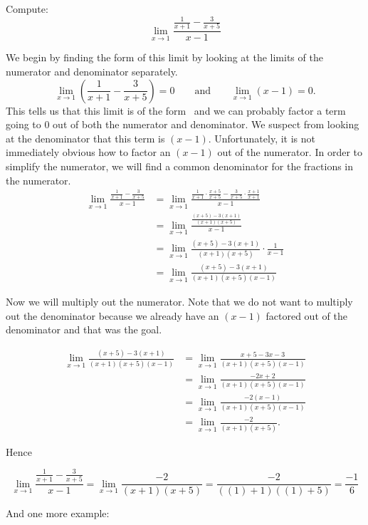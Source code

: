 \documentclass{ximera}
\begin{document}
\begin{example}
  Compute:
  \[
  \lim_{x\to 1} \frac{\frac{1}{x+1}-\frac{3}{x+5}}{x-1}
  \]
\begin{explanation}
  We begin by finding the form of this limit by looking at the limits
  of the numerator and denominator separately.
  \[
  \lim_{x\to 1}\left(\frac{1}{x+1}-\frac{3}{x+5}\right)=0\qquad\text{and}\qquad\lim_{x\to 1}\left(x-1\right)=0.
  \]
This tells us that this limit is of the form \zeroOverZero\ and we can
probably factor a term going to $0$ out of both the numerator and
denominator.  We suspect from looking at the denominator that this
term is $(x-1)$.  Unfortunately, it is not immediately obvious how to
factor an $(x-1)$ out of the numerator.  In order to simplify the
numerator, we will find a common denominator for the fractions in the
numerator.
\begin{align*}
\lim_{x\to 1} \frac{\frac{1}{x+1}-\frac{3}{x+5}}{x-1}  &= \lim_{x\to 1} \frac{\frac{1}{x+1} \cdot \frac{x+5}{x+5}-\frac{3}{x+5} \cdot \frac{x+1}{x+1}}{x-1}\\
&= \lim_{x\to 1} \frac{\frac{(x+5)-3(x+1)}{(x+1)(x+5)}}{x-1}\\
&= \lim_{x\to 1}\frac{(x+5)-3(x+1)}{(x+1)(x+5)} \cdot \frac{1}{x-1}\\
&= \lim_{x\to 1}\frac{(x+5)-3(x+1)}{(x+1)(x+5)(x-1)}
\end{align*}

Now we will multiply out the numerator.  Note that we do not want to
multiply out the denominator because we already have an $(x-1)$
factored out of the denominator and that was the goal.

\begin{align*}
\lim_{x\to 1}\frac{(x+5)-3(x+1)}{(x+1)(x+5)(x-1)} &= \lim_{x\to 1}\frac{x+5-3x-3}{(x+1)(x+5)(x-1)} \\
&= \lim_{x\to 1}\frac{-2x+2}{(x+1)(x+5)(x-1)}\\
&= \lim_{x\to 1}\frac{-2(x-1)}{(x+1)(x+5)(x-1)}\\
&= \lim_{x\to 1}\frac{-2}{(x+1)(x+5)}.
\end{align*}
  
Hence

\[
\lim_{x\to 1} \frac{\frac{1}{x+1}-\frac{3}{x+5}}{x-1}=\lim_{x\to 1}\frac{-2}{(x+1)(x+5)} = \frac{-2}{((1)+1)((1)+5)} = \frac{-1}{6}
\]
\end{explanation}
\end{example}

And one more example:
\end{document}

